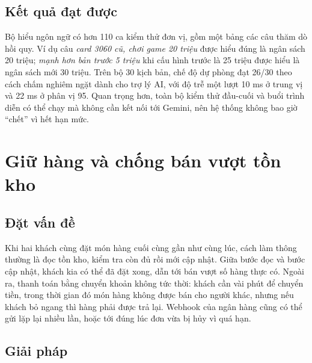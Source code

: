 \subsection{Kết quả đạt được}

Bộ hiểu ngôn ngữ có hơn 110 ca kiểm thử đơn vị, gồm một bảng các câu thăm dò hồi quy. Ví dụ câu \emph{card 3060 cũ, chơi game 20 triệu} được hiểu đúng là ngân sách 20 triệu; \emph{mạnh hơn bản trước 5 triệu} khi cấu hình trước là 25 triệu được hiểu là ngân sách mới 30 triệu. Trên bộ 30 kịch bản, chế độ dự phòng đạt 26/30 theo cách chấm nghiêm ngặt dành cho trợ lý AI, với độ trễ một lượt 10 ms ở trung vị và 22 ms ở phân vị 95. Quan trọng hơn, toàn bộ kiểm thử đầu-cuối và buổi trình diễn có thể chạy mà không cần kết nối tới Gemini, nên hệ thống không bao giờ ``chết'' vì hết hạn mức.

\section{Giữ hàng và chống bán vượt tồn kho}

\subsection{Đặt vấn đề}

Khi hai khách cùng đặt món hàng cuối cùng gần như cùng lúc, cách làm thông thường là đọc tồn kho, kiểm tra còn đủ rồi mới cập nhật. Giữa bước đọc và bước cập nhật, khách kia có thể đã đặt xong, dẫn tới bán vượt số hàng thực có. Ngoài ra, thanh toán bằng chuyển khoản không tức thời: khách cần vài phút để chuyển tiền, trong thời gian đó món hàng không được bán cho người khác, nhưng nếu khách bỏ ngang thì hàng phải được trả lại. Webhook của ngân hàng cũng có thể gửi lặp lại nhiều lần, hoặc tới đúng lúc đơn vừa bị hủy vì quá hạn.

\subsection{Giải pháp}

